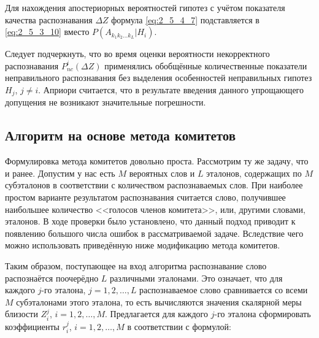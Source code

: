 Для нахождения апостериорных вероятностей гипотез с учётом показателя качества распознавания $\Delta Z$ формула \eqref{eq:2_5_4_7} подставляется в \eqref{eq:2_5_3_10} вместо $P(A_{k_1 k_2 \dots k_L}|H_i)$.

Следует подчеркнуть, что во время оценки вероятности некорректного распознавания $P_{nc}^i(\Delta Z)$ применялись обобщённые количественные показатели неправильного распознавания без выделения особенностей неправильных гипотез $H_j$, $j \ne i$.
Априори считается, что в результате введения данного упрощающего допущения не возникают значительные погрешности.


\subsection{Алгоритм на основе метода комитетов} \label{sect2_5_5}

Формулировка метода комитетов довольно проста.
Рассмотрим ту же задачу, что и ранее.
Допустим у нас есть $M$ вероятных слов и $L$ эталонов, содержащих по $M$ субэталонов в соответствии с количеством распознаваемых слов.
При наиболее простом варианте результатом распознавания считается слово, получившее наибольшее количество <<голосов членов комитета>>, или, другими словами, эталонов.
В ходе проверки было установлено, что данный подход приводит к появлению большого числа ошибок в рассматриваемой задаче.
Вследствие чего можно использовать приведённую ниже модификацию метода комитетов.

Таким образом, поступающее на вход алгоритма распознавание слово распознаётся поочерёдно $L$ различными эталонами.
Это означает, что для каждого $j$-го эталона, $j = 1, 2, \dots, L$ распознаваемое слово сравнивается со всеми $M$ субэталонами этого эталона, то есть вычисляются значения скалярной меры близости $Z_i^j$, $i = 1, 2, \dots, M$.
Предлагается для каждого $j$-го эталона сформировать коэффициенты $r_i^j$, $i = 1, 2, \dots, M$ в соответствии с формулой:

